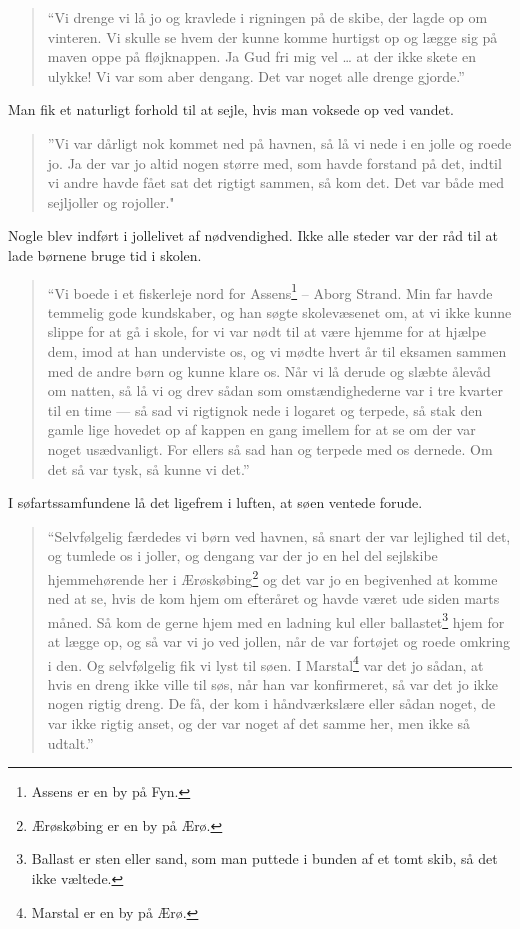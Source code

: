 \begin{quote}
``Vi drenge vi lå jo og kravlede i rigningen på de skibe, der lagde op
om vinteren. Vi skulle se hvem der kunne komme hurtigst op og lægge sig
på maven oppe på fløjknappen. Ja Gud fri mig vel \ldots{} at der ikke
skete en ulykke! Vi var som aber dengang. Det var noget alle drenge
gjorde.''
\end{quote}

Man fik et naturligt forhold til at sejle, hvis man voksede op ved
vandet.

\begin{quote}
''Vi var dårligt nok kommet ned på havnen, så lå vi nede i en jolle og
roede jo. Ja der var jo altid nogen større med, som havde forstand på
det, indtil vi andre havde fået sat det rigtigt sammen, så kom det. Det
var både med sejljoller og rojoller."
\end{quote}

Nogle blev indført i jollelivet af nødvendighed. Ikke alle steder var
der råd til at lade børnene bruge tid i skolen.

\begin{quote}
``Vi boede i et fiskerleje nord for Assens\footnote{Assens er en by på
  Fyn.} -- Aborg Strand. Min far havde temmelig gode kundskaber, og han
søgte skolevæsenet om, at vi ikke kunne slippe for at gå i skole, for vi
var nødt til at være hjemme for at hjælpe dem, imod at han underviste
os, og vi mødte hvert år til eksamen sammen med de andre børn og kunne
klare os. Når vi lå derude og slæbte ålevåd om natten, så lå vi og drev
sådan som omstændighederne var i tre kvarter til en time --- så sad vi
rigtignok nede i logaret og terpede, så stak den gamle lige hovedet op
af kappen en gang imellem for at se om der var noget usædvanligt. For
ellers så sad han og terpede med os dernede. Om det så var tysk, så
kunne vi det.''
\end{quote}

I søfartssamfundene lå det ligefrem i luften, at søen ventede forude.

\begin{quote}
``Selvfølgelig færdedes vi børn ved havnen, så snart der var lejlighed
til det, og tumlede os i joller, og dengang var der jo en hel del
sejlskibe hjemmehørende her i Ærøskøbing\footnote{Ærøskøbing er en by på
  Ærø.} og det var jo en begivenhed at komme ned at se, hvis de kom hjem
om efteråret og havde været ude siden marts måned. Så kom de gerne hjem
med en ladning kul eller ballastet\footnote{Ballast er sten eller sand,
  som man puttede i bunden af et tomt skib, så det ikke væltede.} hjem
for at lægge op, og så var vi jo ved jollen, når de var fortøjet og
roede omkring i den. Og selvfølgelig fik vi lyst til søen. I
Marstal\footnote{Marstal er en by på Ærø.} var det jo sådan, at hvis en
dreng ikke ville til søs, når han var konfirmeret, så var det jo ikke
nogen rigtig dreng. De få, der kom i håndværkslære eller sådan noget, de
var ikke rigtig anset, og der var noget af det samme her, men ikke så
udtalt.''
\end{quote}

